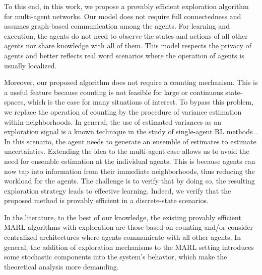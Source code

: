 \documentclass[lettersize,journal]{IEEEtran}
\begin{document}
 \par 
 To this end, in this work, we propose a provably efficient exploration algorithm for multi-agent networks. Our model does not require full connectedness and assumes graph-based communication among the agents. For learning and execution, the agents do not need to observe the states and actions of all other agents nor share knowledge with all of them. This model  respects the privacy of agents and better reflects real word scenarios where the operation of agents is usually localized.  \par 
 Moreover, our proposed algorithm does not require a counting mechanism. This is a useful feature because counting is not feasible for large or continuous state-spaces, which is the case for many situations of interest.   To bypass this problem, we replace the operation of counting by the procedure of variance estimation within neighborhoods. In general, the use of estimated variances as an exploration signal is a known technique in the study of single-agent RL methods \cite{TDU, TDE}. In this scenario, the agent needs to generate an ensemble of estimates to estimate uncertainties. Extending the idea to the multi-agent case allows us to avoid the need for ensemble estimation at the individual agents. This is because agents can now tap into information from their immediate neighborhoods, thus reducing the workload for the agents. The challenge is to verify that by doing so, the resulting exploration strategy leads to effective learning. Indeed, we verify that the proposed method is  provably efficient in a discrete-state scenarios. \par 
 In the literature, to the best of our knowledge, the existing provably efficient MARL algorithms with exploration are those based on counting \cite{justin} and/or consider centralized architectures where agents communicate with all other agents\cite{LSVI_based}.  
In general, the addition of exploration mechanisms to the MARL setting introduces some stochastic components into the system's behavior, which make the theoretical analysis more demanding.  
\end{document}
